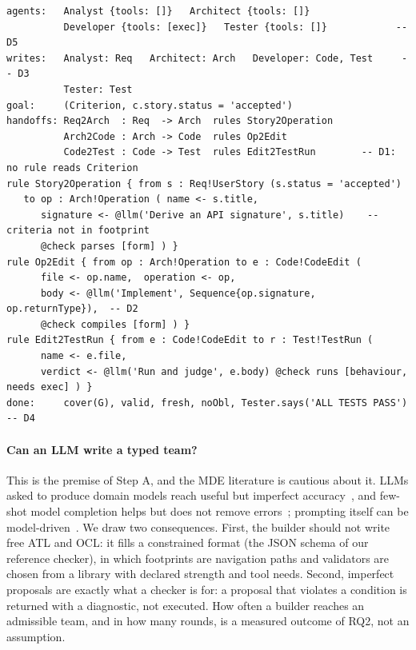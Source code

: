 \documentclass[10pt,a4paper]{article}
\newcommand{\D}[1]{\textsf{D#1}}
\newcommand{\devteam}{\textsc{DevTeam}}
\newcommand{\file}[1]{\texttt{#1}}
\begin{document}
\begin{lstlisting}[style=model, caption={Illustrative first proposal of a typed team for the \devteam{} task, containing one instance of each defect \D{1}--\D{5} (rendering of \file{teams/devteam_proposal.json}).}, label={lst:proposal}]
agents:   Analyst {tools: []}   Architect {tools: []}
          Developer {tools: [exec]}   Tester {tools: []}            -- D5
writes:   Analyst: Req   Architect: Arch   Developer: Code, Test     -- D3
          Tester: Test
goal:     (Criterion, c.story.status = 'accepted')
handoffs: Req2Arch  : Req  -> Arch  rules Story2Operation
          Arch2Code : Arch -> Code  rules Op2Edit
          Code2Test : Code -> Test  rules Edit2TestRun        -- D1: no rule reads Criterion
rule Story2Operation { from s : Req!UserStory (s.status = 'accepted')
   to op : Arch!Operation ( name <- s.title,
      signature <- @llm('Derive an API signature', s.title)    -- criteria not in footprint
      @check parses [form] ) }
rule Op2Edit { from op : Arch!Operation to e : Code!CodeEdit (
      file <- op.name,  operation <- op,
      body <- @llm('Implement', Sequence{op.signature, op.returnType}),  -- D2
      @check compiles [form] ) }
rule Edit2TestRun { from e : Code!CodeEdit to r : Test!TestRun (
      name <- e.file,
      verdict <- @llm('Run and judge', e.body) @check runs [behaviour, needs exec] ) }
done:     cover(G), valid, fresh, noObl, Tester.says('ALL TESTS PASS')    -- D4
\end{lstlisting}

\paragraph{Can an LLM write a typed team?} This is the premise of Step A, and
the MDE literature is cautious about it. LLMs asked to produce domain models
reach useful but imperfect accuracy~\cite{chen2023domainmodeling}, and
few-shot model completion helps but does not remove
errors~\cite{chaaben2023fewshot}; prompting itself can be
model-driven~\cite{clariso2023mdpe}. We draw two consequences. First, the
builder should not write free ATL and OCL: it fills a constrained format
(the JSON schema of our reference checker), in which footprints are
navigation paths and validators are chosen from a library with declared
strength and tool needs. Second, imperfect proposals are exactly what a
checker is for: a proposal that violates a condition is returned with a
diagnostic, not executed. How often a builder reaches an admissible team,
and in how many rounds, is a measured outcome of RQ2, not an assumption.
\end{document}
